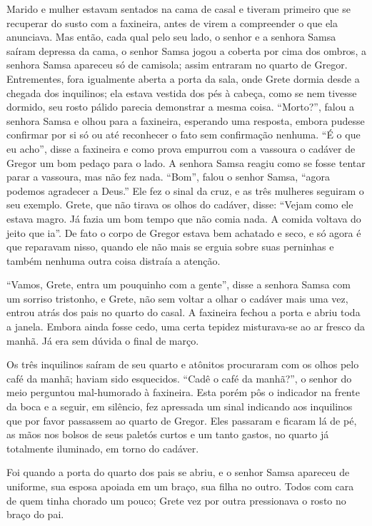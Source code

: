 Marido e mulher estavam sentados na cama de casal e tiveram primeiro que
se recuperar do susto com a faxineira, antes de virem a compreender o que
ela anunciava. Mas então, cada qual pelo seu lado, o senhor e a senhora
Samsa saíram depressa da cama, o senhor Samsa jogou a coberta por cima dos
ombros, a senhora Samsa apareceu só de camisola; assim entraram no quarto
de Gregor. Entrementes, fora igualmente aberta a porta da sala, onde Grete
dormia desde a chegada dos inquilinos; ela estava vestida dos pés à
cabeça, como se nem tivesse dormido, seu rosto pálido parecia demonstrar a
mesma coisa. “Morto?”, falou a senhora Samsa e olhou para a faxineira,
esperando uma resposta, embora pudesse confirmar por si só ou até
reconhecer o fato sem confirmação nenhuma. “É o que eu acho”, disse a
faxineira e como prova empurrou com a vassoura o cadáver de Gregor um bom
pedaço para o lado. A senhora Samsa reagiu como se fosse tentar parar a
vassoura, mas não fez nada. “Bom”, falou o senhor Samsa, “agora podemos
agradecer a Deus.” Ele fez o sinal da cruz, e as três mulheres seguiram o
seu exemplo. Grete, que não tirava os olhos do cadáver, disse: “Vejam como
ele estava magro. Já fazia um bom tempo que não comia nada. A comida
voltava do jeito que ia”. De fato o corpo de Gregor estava bem achatado e
seco, e só agora é que reparavam nisso, quando ele não mais se erguia
sobre suas perninhas e também nenhuma outra coisa distraía a atenção.

“Vamos, Grete, entra um pouquinho com a gente”, disse a senhora Samsa com
um sorriso tristonho, e Grete, não sem voltar a olhar o cadáver mais uma
vez, entrou atrás dos pais no quarto do casal. A faxineira fechou a porta
e abriu toda a janela. Embora ainda fosse cedo, uma certa tepidez
misturava-se ao ar fresco da manhã. Já era sem dúvida o final de março.

Os três inquilinos saíram de seu quarto e atônitos procuraram com os olhos
pelo café da manhã; haviam sido esquecidos. “Cadê o café da manhã?”, o
senhor do meio perguntou mal-humorado à faxineira. Esta porém pôs o
indicador na frente da boca e a seguir, em silêncio, fez apressada um
sinal indicando aos inquilinos que por favor passassem ao quarto de
Gregor. Eles passaram e ficaram lá de pé, as mãos nos bolsos de seus
paletós curtos e um tanto gastos, no quarto já totalmente iluminado, em
torno do cadáver.

Foi quando a porta do quarto dos pais se abriu, e o senhor Samsa apareceu
de uniforme, sua esposa apoiada em um braço, sua filha no outro. Todos com
cara de quem tinha chorado um pouco; Grete vez por outra pressionava o
rosto no braço do pai.

